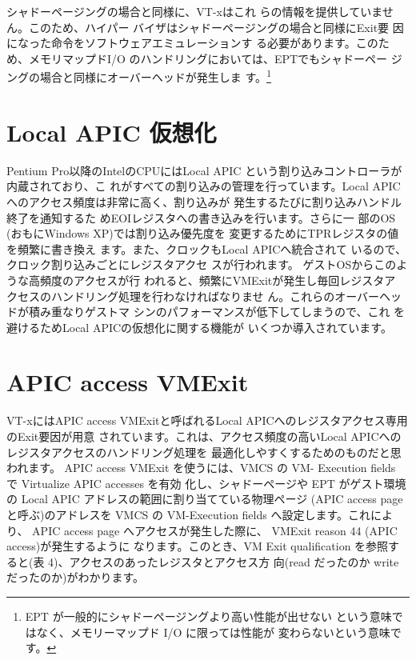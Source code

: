 
 シャドーページングの場合と同様に、VT-xはこれ
らの情報を提供していません。このため、ハイパー
バイザはシャドーページングの場合と同様にExit要
因になった命令をソフトウェアエミュレーションす
る必要があります。このため、メモリマップドI/O
のハンドリングにおいては、EPTでもシャドーペー
ジングの場合と同様にオーバーヘッドが発生しま
す。\footnote[3]{
EPT が一般的にシャドーページングより高い性能が出せない
という意味ではなく、メモリーマップド I/O に限っては性能が
変わらないという意味です。
}

\section{Local APIC 仮想化}

 Pentium Pro以降のIntelのCPUにはLocal APIC
という割り込みコントローラが内蔵されており、こ
れがすべての割り込みの管理を行っています。Local
APICへのアクセス頻度は非常に高く、割り込みが
発生するたびに割り込みハンドル終了を通知するた
めEOIレジスタへの書き込みを行います。さらに一
部のOS (おもにWindows XP)では割り込み優先度を
変更するためにTPRレジスタの値を頻繁に書き換え
ます。また、クロックもLocal APICへ統合されて
いるので、クロック割り込みごとにレジスタアクセ
スが行われます。
 ゲストOSからこのような高頻度のアクセスが行
われると、頻繁にVMExitが発生し毎回レジスタア
クセスのハンドリング処理を行わなければなりませ
ん。これらのオーバーヘッドが積み重なりゲストマ
シンのパフォーマンスが低下してしまうので、これ
を避けるためLocal APICの仮想化に関する機能が
いくつか導入されています。

\section{APIC access VMExit}

 VT-xにはAPIC access VMExitと呼ばれるLocal
APICへのレジスタアクセス専用のExit要因が用意
されています。これは、アクセス頻度の高いLocal
APICへのレジスタアクセスのハンドリング処理を
最適化しやすくするためのものだと思われます。
 APIC access VMExit を使うには、VMCS の VM-
Execution fields で Virtualize APIC accesses を有効
化し、シャドーページや EPT がゲスト環境の Local
APIC アドレスの範囲に割り当てている物理ページ
(APIC access page と呼ぶ)のアドレスを VMCS の
VM-Execution fields へ設定します。これにより、
APIC access page へアクセスが発生した際に、
VMExit reason 44 (APIC access)が発生するように
なります。このとき、VM Exit qualification を参照す
ると(表 4)、アクセスのあったレジスタとアクセス方
向(read だったのか write だったのか)がわかります。

